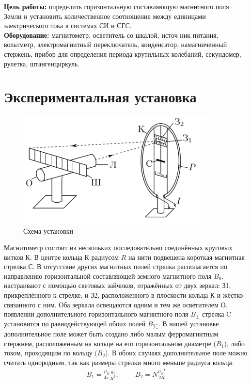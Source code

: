 \textbf{Цель работы:} определить горизонтальную составляющую магнитного
поля Земли и установить количественное соотношение между единицами
электрического тока в системах СИ и СГС.
\\\indent
\textbf{Оборудование:} магнитометр, осветитель со шкалой, источ­
ник питания, вольтметр, электромагнитный переключатель, конденсатор,
намагниченный стержень, прибор для определения периода крутильных
колебаний, секундомер, рулетка, штангенциркуль. 
\section*{Экспериментальная установка}
\begin{figure}
    \centering
    \includegraphics[width=10cm]{setup.png}
    \caption{Схема установки}
\end{figure}
Магнитометр состоит из нескольких последовательно соединённых круговых витков К. В центре кольца К радиусом $R$ на нити подвешена короткая магнитная стрелка С. В отсутствие других магнитных полей стрелка располагается по направлению горизонтальной составляющей земного магнитного поля $B_0$. 
\\ настраивают с помощью световых зайчиков, отражённых от двух зеркал: З1, прикреплённого к стрелке, и З2, расположенного в плоскости кольца К и жёстко связанного с ним. Оба зеркала освещаются одним и тем же осветителем О.
\\ появлении дополнительного горизонтального магнитного поля $B_{\perp}$ стрелка C установится по равнодействующей обоих полей $B_{\sum}$. 
В нашей установке дополнительное поле может быть создано
либо малым ферромагнитным стержнем, расположенным на кольце на
его горизонтальном диаметре ($B_1$), либо током, проходящим по кольцу
($B_2$). В обоих случаях дополнительное поле можно считать однородным,
так как размеры стрелки много меньше радиуса кольца.
\begin{align}
    B_1 = \frac{\mu_0}{4\pi}\frac{m}{R^3}, \hspace{1cm} B_2 = N\frac{\mu_0 I}{2R}
\end{align}
